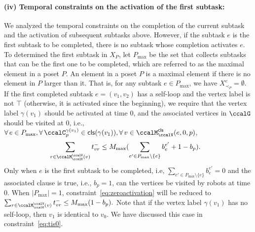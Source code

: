 \documentclass[Afour,sageh,times]{sagej}
\newcommand{\clause}[1]{\mathsf{cls}(#1)}
\begin{document}
{{{{{\paragraph{(iv) Temporal constraints on the activation of the first subtask:}
We analyzed the temporal constraints on the completion of the current subtask and the activation of subsequent subtasks above. However, if the subtask $e$ is the first subtask to be completed, there is no subtask whose completion activates $e$. To determined the first subtask in $X_P$,  let $P_{\text{max}}$ be the set that collects subtasks that can be the first one to be completed, which are referred to as the maximal element in a poset $P$. An element in a poset $P$ is a maximal element if there is no element in $P$ larger than it. That is, for  any subtask  $e \in P_{\text{max}}$, we have $X_{\prec_P}^e = \emptyset$. If the first completed subtask $e = (v_1 ,v_2)$ has a self-loop and the vertex label is not $\top$ (otherwise, it is activated since the beginning), we require that the vertex label $\gamma(v_1)$ should be activated at time 0, and the associated vertices in $\ccalG$ should be visited at 0,   i.e., $\forall\, e \in P_{\text{max}}, \forall\, \ccalC_p^{\gamma(v_1)} \in \clause{\gamma(v_1)}, \forall \,v \in \ccalM^\mathsf{cls}_\ccalV(e,0,p)$,
\begingroup\makeatletter\def\f@size{10}\check@mathfonts
\def\maketag@@@#1{\hbox{\m@th\normalsize\normalfont#1}}%
\begin{align}\label{eq:zeroactivation}
  & \sum_{r\in \ccalM^\ccalV_{\ccalK}(v)} t_{vr}^-  \leq M_{\text{max}} (\sum_{e' \in P_{\text{max}}\setminus \{e\}  } {b}_{e}^{e'} + 1- b_p).
\end{align}
\endgroup
Only when $e$ is the first subtask to be completed, i.e, $\sum_{e' \in P_{\text{max}}\setminus \{e\}  } {b}_{e}^{e'}=0$ and the associated clause is true, i.e., $b_p=1$, can the vertices be visited by robots at time 0. When $|P_{\text{max}}|=1$, constraint~\eqref{eq:zeroactivation} will be reduced to  $ \sum_{r\in \ccalM^\ccalV_{\ccalK}(v)} t_{vr}^-  \leq M_{\text{max}} (1- b_p).$ Note that if the vertex label $\gamma(v_1)$ has no self-loop, then $v_1$ is identical to $v_0$. We have discussed  this case in constraint~\eqref{eq:tis0}.


}}}}}
\end{document}
